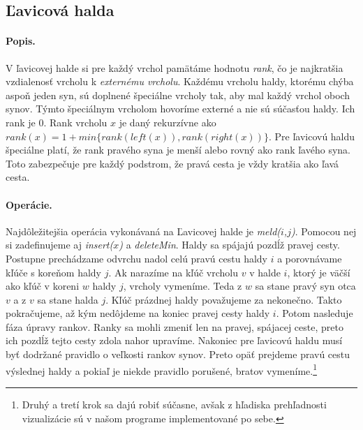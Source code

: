 \subsection{Ľavicová halda} 
\paragraph{Popis.}
V ľavicovej halde si pre každý vrchol pamätáme hodnotu \emph{rank}, čo je najkratšia 
vzdialenosť vrcholu k \emph{externému vrcholu}. Každému vrcholu haldy, ktorému chýba aspoň jeden syn, sú 
doplnené špeciálne vrcholy tak, aby mal každý vrchol oboch synov. Týmto špeciálnym vrcholom hovoríme externé 
a nie sú súčasťou haldy. Ich rank je $0$. Rank vrcholu $x$ je daný rekurzívne ako $rank(x) 
= 1 + min\{rank(left(x)), rank(right(x)) \}$. Pre ľavicovú haldu špeciálne platí, že rank pravého syna je menší 
alebo rovný ako rank ľavého syna. Toto zabezpečuje pre každý podstrom, že pravá cesta je vždy kratšia 
ako ľavá cesta.

\paragraph{Operácie.}
Najdôležitejšia operácia vykonávaná na Ľavicovej halde je \emph{meld($i$,$j$)}. Pomocou nej si zadefinujeme aj \emph{insert($x$)} a 
\emph{deleteMin}. Haldy sa spájajú pozdĺž pravej cesty. Postupne prechádzame odvrchu nadol celú pravú cestu haldy $i$ a 
porovnávame kľúče s koreňom haldy $j$. Ak narazíme na kľúč vrcholu $v$ v halde $i$, ktorý je väčší ako kľúč v koreni 
$w$ haldy $j$, vrcholy vymeníme. Teda z $w$ sa stane pravý syn otca $v$ a z $v$ sa stane halda $j$. Kľúč prázdnej 
haldy považujeme za nekonečno. Takto pokračujeme, až kým nedôjdeme na koniec pravej cesty haldy $i$.
Potom nasleduje fáza úpravy rankov. Ranky sa mohli zmeniť len na pravej, spájacej ceste, preto ich pozdĺž tejto cesty 
zdola nahor upravíme.
Nakoniec pre ľavicovú haldu musí byť dodržané pravidlo o veľkosti rankov synov. Preto opäť prejdeme pravú cestu 
výslednej haldy a pokiaľ je niekde pravidlo porušené, bratov vymeníme.\footnote{Druhý a tretí krok sa dajú robiť 
súčasne, avšak z hľadiska prehľadnosti vizualizácie sú v našom programe implementované po sebe.}

